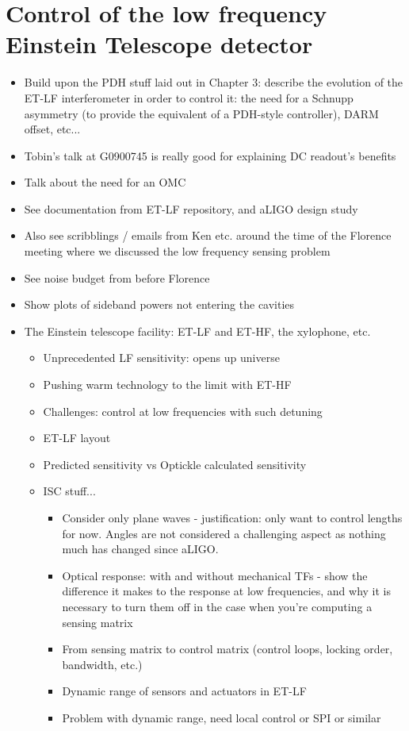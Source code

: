 \chapter{\label{c:et-lf-control}Control of the low frequency Einstein Telescope detector}

\begin{itemize}
  \item Build upon the PDH stuff laid out in Chapter 3: describe the evolution of the ET-LF interferometer in order to control it: the need for a Schnupp asymmetry (to provide the equivalent of a PDH-style controller), DARM offset, etc...
  
  \item Tobin's talk at G0900745 is really good for explaining DC readout's benefits
  
  \item Talk about the need for an OMC
  
  \item See documentation from ET-LF repository, and aLIGO design study
  
  \item Also see scribblings / emails from Ken etc. around the time of the Florence meeting where we discussed the low frequency sensing problem
  
  \item See noise budget from before Florence
  
  \item Show plots of sideband powers not entering the cavities

  \item The Einstein telescope facility: ET-LF and ET-HF, the xylophone, etc.
    \begin{itemize}
      \item Unprecedented LF sensitivity: opens up universe
      \item Pushing warm technology to the limit with ET-HF
      \item Challenges: control at low frequencies with such detuning
      \item ET-LF layout
      \item Predicted sensitivity vs Optickle calculated sensitivity
      \item ISC stuff...
	\begin{itemize}
	  \item Consider only plane waves - justification: only want to control lengths for now. Angles are not considered a challenging aspect as nothing much has changed since aLIGO.
	  \item Optical response: with and without mechanical TFs - show the difference it makes to the response at low frequencies, and why it is necessary to turn them off in the case when you're computing a sensing matrix
	  \item From sensing matrix to control matrix (control loops, locking order, bandwidth, etc.)
	  \item Dynamic range of sensors and actuators in ET-LF
	  \item Problem with dynamic range, need local control or SPI or similar
	\end{itemize}
      \end{itemize}
      

\end{itemize}
